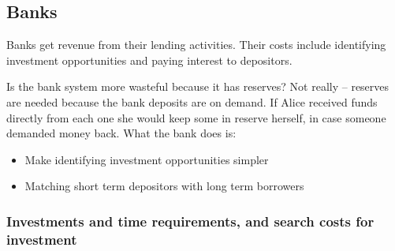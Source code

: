 
\subsection{Banks}

Banks get revenue from their lending activities. Their costs include identifying investment opportunities and paying interest to depositors.

Is the bank system more wasteful because it has reserves? Not really – reserves are needed because the bank deposits are on demand. If Alice received funds directly from each one she would keep some in reserve herself, in case someone demanded money back. What the bank does is:

\begin{itemize}
\item Make identifying investment opportunities simpler
\item Matching short term depositors with long term borrowers
\end{itemize}

\subsubsection{Investments and time requirements, and search costs for investment}

